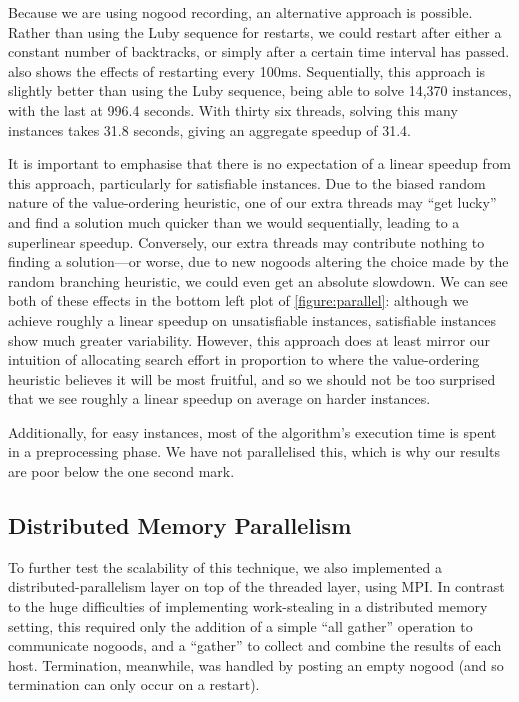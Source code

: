\documentclass[runningheads]{llncs}
\begin{document}
Because we are using nogood recording, an alternative approach is possible. Rather than using the
Luby sequence for restarts, we could restart after either a constant number of backtracks, or simply
after a certain time interval has passed.  also shows the effects of restarting
every 100ms. Sequentially, this approach is slightly better than using the Luby sequence, being able to
solve 14,370 instances, with the last at 996.4 seconds. With thirty six threads, solving this many
instances takes 31.8 seconds, giving an aggregate speedup of 31.4.

It is important to emphasise that there is no expectation of a linear speedup from this approach,
particularly for satisfiable instances. Due to the biased random nature of the value-ordering heuristic,
one of our extra threads may ``get lucky'' and find a solution much quicker than we would
sequentially, leading to a superlinear speedup. Conversely, our extra threads may contribute nothing to finding a
solution---or worse, due to new nogoods altering the choice made by the random branching heuristic,
we could even get an absolute slowdown. We can see both of these effects in the bottom left plot of
\cref{figure:parallel}: although we achieve roughly a linear speedup on unsatisfiable instances,
satisfiable instances show much greater variability. However, this approach does at least mirror our intuition of
allocating search effort in proportion to where the value-ordering heuristic believes it will be
most fruitful, and so we should not be too surprised that we see roughly a linear speedup on average
on harder instances.

Additionally, for easy instances, most of the algorithm's execution time is spent in a preprocessing
phase. We have not parallelised this, which is why our results are poor below the one second mark.

\subsection{Distributed Memory Parallelism}

To further test the scalability of this technique, we also implemented a distributed-parallelism
layer on top of the threaded layer, using MPI. In contrast to the huge difficulties of implementing
work-stealing in a distributed memory setting, this required only the addition of a simple ``all
gather'' operation to communicate nogoods, and a ``gather'' to collect and combine the results of
each host. Termination, meanwhile, was handled by posting an empty nogood (and so termination can
only occur on a restart).
\end{document}
